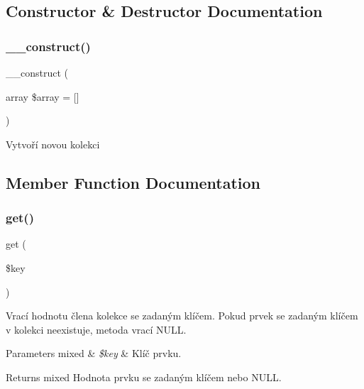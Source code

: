 \subsection{Constructor \& Destructor Documentation}
\mbox{\label{class_pes_1_1_collection_1_1_map_collection_a051ddc27b65d0b3d514a7b832bb60912}} 
\subsubsection{\texorpdfstring{\+\_\+\+\_\+construct()}{\_\_construct()}}
{\footnotesize\ttfamily \+\_\+\+\_\+construct (\begin{DoxyParamCaption}\item[{array}]{\$array = {\ttfamily \mbox{[}\mbox{]}} }\end{DoxyParamCaption})}

Vytvoří novou kolekci 

\subsection{Member Function Documentation}
\mbox{\label{class_pes_1_1_collection_1_1_map_collection_a24a9bf83a1002d46ece83a93d14bd921}} 
\subsubsection{\texorpdfstring{get()}{get()}}
{\footnotesize\ttfamily get (\begin{DoxyParamCaption}\item[{}]{\$key }\end{DoxyParamCaption})}

Vrací hodnotu člena kolekce se zadaným klíčem. Pokud prvek se zadaným klíčem v kolekci neexistuje, metoda vrací N\+U\+LL.


\begin{DoxyParams}[1]{Parameters}
mixed & {\em \$key} & Klíč prvku. \\
\hline
\end{DoxyParams}
\begin{DoxyReturn}{Returns}
mixed Hodnota prvku se zadaným klíčem nebo N\+U\+LL. 
\end{DoxyReturn}


